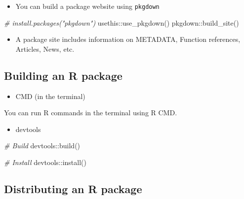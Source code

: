 \documentclass[
]{book}
\newenvironment{Shaded}{\begin{snugshade}}{\end{snugshade}}
\newcommand{\CommentTok}[1]{\textcolor[rgb]{0.56,0.35,0.01}{\textit{#1}}}
\newcommand{\FunctionTok}[1]{\textcolor[rgb]{0.00,0.00,0.00}{#1}}
\newcommand{\NormalTok}[1]{#1}
\newcommand{\SpecialCharTok}[1]{\textcolor[rgb]{0.00,0.00,0.00}{#1}}
\providecommand{\tightlist}{%
  \setlength{\itemsep}{0pt}\setlength{\parskip}{0pt}}
\begin{document}
\begin{itemize}
\tightlist
\item
  You can build a package website using \texttt{pkgdown}
\end{itemize}

\begin{Shaded}
\begin{Highlighting}[]
\CommentTok{\# install.packages("pkgdown")}
\NormalTok{usethis}\SpecialCharTok{::}\FunctionTok{use\_pkgdown}\NormalTok{()}
\NormalTok{pkgdown}\SpecialCharTok{::}\FunctionTok{build\_site}\NormalTok{()}
\end{Highlighting}
\end{Shaded}

\begin{itemize}
\tightlist
\item
  A package site includes information on METADATA, Function references, Articles, News, etc.
\end{itemize}

\hypertarget{building-an-r-package}{%
\subsection{Building an R package}\label{building-an-r-package}}

\begin{itemize}
\tightlist
\item
  CMD (in the terminal)
\end{itemize}

You can run R commands in the terminal using R CMD.

\begin{itemize}
\tightlist
\item
  devtools
\end{itemize}

\begin{Shaded}
\begin{Highlighting}[]
\CommentTok{\# Build }
\NormalTok{devtools}\SpecialCharTok{::}\FunctionTok{build}\NormalTok{()}

\CommentTok{\# Install }
\NormalTok{devtools}\SpecialCharTok{::}\FunctionTok{install}\NormalTok{()}
\end{Highlighting}
\end{Shaded}

\hypertarget{distributing-an-r-package}{%
\subsection{Distributing an R package}\label{distributing-an-r-package}}
\end{document}
